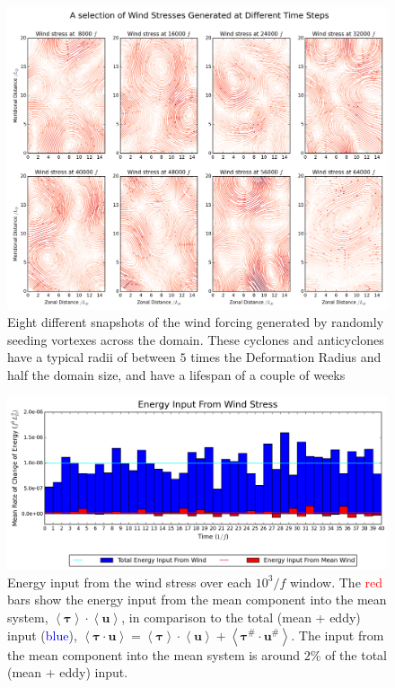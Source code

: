\documentclass[12pt,a4paper]{report}
\newcommand*\nthkmean[1]{\left\langle{#1}\right\rangle}
\newcommand*\nthkres[1]{{#1}^{\#}}
\begin{document}
\begin{figure}
	\centering
	\includegraphics[width=\linewidth]{StochWind}
	\caption{Eight different snapshots of the wind forcing
		generated by randomly seeding vortexes
		across the domain.
		These cyclones and anticyclones have a typical radii of between $5$ times
		the Deformation Radius and half the domain size, and have a lifespan of a couple of weeks}
	\label{fig:StochWind}
\end{figure}

\begin{figure}
	\centering
	\includegraphics[width=\linewidth]{meaneddywind}
	\caption{ Energy input from the wind stress over each $10^{3}/f$ window. 
		The \textcolor{red}{red} bars show the energy input from
		the mean component into the mean system,
		$\nthkmean{\boldsymbol{\tau}}\cdot\nthkmean{\boldsymbol{u}}$, in comparison
		to the total (mean + eddy) input (\textcolor{blue}{blue}), $\nthkmean{\boldsymbol{\tau}\cdot\boldsymbol{u}}
		=\nthkmean{\boldsymbol{\tau}}\cdot\nthkmean{\boldsymbol{u}}+\nthkmean{\nthkres{\boldsymbol{\tau}}\cdot\nthkres{\boldsymbol{u}}}$. The input from
		the mean component into the mean system is around $2\%$ of
		the total (mean + eddy) input.}
	\label{fig:meaneddywind}
\end{figure}
\end{document}
